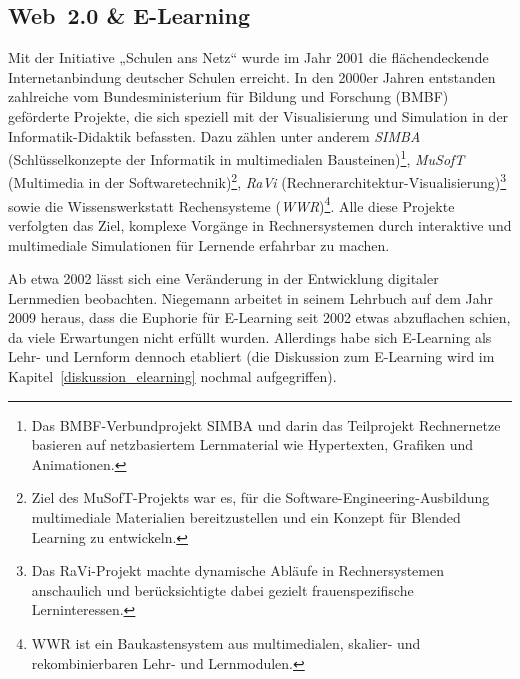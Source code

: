 \subsection{Web~2.0 \& E-Learning}

Mit der Initiative „Schulen ans Netz“\cite{schulen_ans_netz_ev_schulen_nodate} wurde im Jahr 2001 die flächendeckende Internetanbindung deutscher Schulen erreicht\cite{kopcke_internet_2016}. In den 2000er Jahren entstanden zahlreiche vom Bundesministerium für Bildung und Forschung (BMBF) geförderte Projekte, die sich speziell mit der Visualisierung und Simulation in der Informatik-Didaktik befassten. Dazu zählen unter anderem \textit{SIMBA} (Schlüsselkonzepte der Informatik in multimedialen Bausteinen)\footnote{Das BMBF-Verbundprojekt SIMBA und darin das Teilprojekt Rechnernetze basieren auf netzbasiertem Lernmaterial wie Hypertexten, Grafiken und Animationen.\parencite[S.~75]{magenheim_blended_2003}}, \textit{MuSofT} (Multimedia in der Softwaretechnik)\footnote{Ziel des MuSofT-Projekts war es, für die Software-Engineering-Ausbildung multimediale Materialien bereitzustellen und ein Konzept für Blended Learning zu entwickeln.\parencite[S.~73]{magenheim_blended_2003}}, \textit{RaVi} (Rechnerarchitektur-Visualisierung)\footnote{Das RaVi-Projekt machte dynamische Abläufe in Rechnersystemen anschaulich und berücksichtigte dabei gezielt frauenspezifische Lerninteressen.\parencite[S.~20]{marwedel_interaktive_2003}} sowie die Wissenswerkstatt Rechensysteme (\textit{WWR})\footnote{WWR ist ein Baukastensystem aus multimedialen, skalier- und rekombinierbaren Lehr- und Lernmodulen.\parencite[S.~1]{kornelsen_inhalte_2004}}. Alle diese Projekte verfolgten das Ziel, komplexe Vorgänge in Rechnersystemen durch interaktive und multimediale Simulationen für Lernende erfahrbar zu machen.

Ab etwa 2002 lässt sich eine Veränderung in der Entwicklung digitaler Lernmedien beobachten. 
Niegemann arbeitet in seinem Lehrbuch auf dem Jahr 2009 heraus, dass die Euphorie für E-Learning seit 2002 etwas abzuflachen schien, da viele Erwartungen nicht erfüllt wurden. Allerdings habe sich E-Learning als Lehr- und Lernform dennoch etabliert (die Diskussion zum E-Learning wird im Kapitel~\ref{diskussion_elearning} nochmal aufgegriffen).\parencite[S.~14]{niegemann_kompendium_2008}

